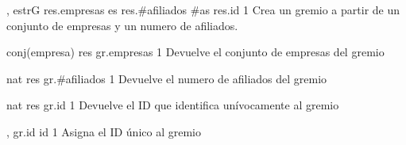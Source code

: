 {, }{estrG}
{
	\state res.empresas \asig es 							
	\state res.\#afiliados \asig \#as 						
	\state res.id  									
}
{1}
{Crea un gremio a partir de un conjunto de empresas y un numero de afiliados.}

{}{conj(empresa)}
{
	\state res \asig gr.empresas 							
}
{1}
{Devuelve el conjunto de empresas del gremio}

{}{nat}
{
	\state res \asig gr.\#afiliados 						
}
{1}
{Devuelve el numero de afiliados del gremio}

{}{nat}
{
	\state res \asig gr.id 									
}
{1}
{Devuelve el ID que identifica un\'ivocamente al gremio}

{, }{}
{
	\state gr.id \asig id 									
}
{1}
{Asigna el ID \'unico al gremio}